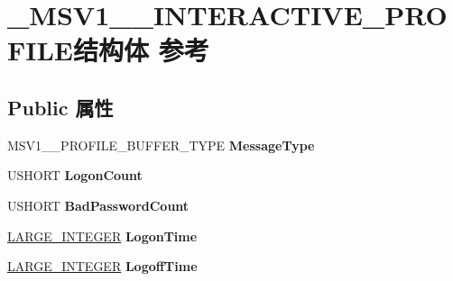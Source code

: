 \hypertarget{struct___m_s_v1__0___i_n_t_e_r_a_c_t_i_v_e___p_r_o_f_i_l_e}{}\section{\+\_\+\+M\+S\+V1\+\_\+\_\+\+I\+N\+T\+E\+R\+A\+C\+T\+I\+V\+E\+\_\+\+P\+R\+O\+F\+I\+L\+E结构体 参考}
\label{struct___m_s_v1__0___i_n_t_e_r_a_c_t_i_v_e___p_r_o_f_i_l_e}
\subsection*{Public 属性}
\begin{DoxyCompactItemize}
\item 
\mbox{\label{struct___m_s_v1__0___i_n_t_e_r_a_c_t_i_v_e___p_r_o_f_i_l_e_a1731444c7f50e4569de16bb6ed8afdf1}} 
M\+S\+V1\+\_\+\_\+\+P\+R\+O\+F\+I\+L\+E\+\_\+\+B\+U\+F\+F\+E\+R\+\_\+\+T\+Y\+PE {\bfseries Message\+Type}
\item 
\mbox{\label{struct___m_s_v1__0___i_n_t_e_r_a_c_t_i_v_e___p_r_o_f_i_l_e_adcb82ccac2503443db13094b898dd3e2}} 
U\+S\+H\+O\+RT {\bfseries Logon\+Count}
\item 
\mbox{\label{struct___m_s_v1__0___i_n_t_e_r_a_c_t_i_v_e___p_r_o_f_i_l_e_af45e7526fdecbcdb3d90996f983c0790}} 
U\+S\+H\+O\+RT {\bfseries Bad\+Password\+Count}
\item 
\mbox{\label{struct___m_s_v1__0___i_n_t_e_r_a_c_t_i_v_e___p_r_o_f_i_l_e_a0dc98efe39747c459d8b042c8304c330}} 
\hyperlink{union___l_a_r_g_e___i_n_t_e_g_e_r}{L\+A\+R\+G\+E\+\_\+\+I\+N\+T\+E\+G\+ER} {\bfseries Logon\+Time}
\item 
\mbox{\label{struct___m_s_v1__0___i_n_t_e_r_a_c_t_i_v_e___p_r_o_f_i_l_e_a41eea2806e41104456cb56de31766e22}} 
\hyperlink{union___l_a_r_g_e___i_n_t_e_g_e_r}{L\+A\+R\+G\+E\+\_\+\+I\+N\+T\+E\+G\+ER} {\bfseries Logoff\+Time}
\item 

\end{DoxyCompactItemize}
